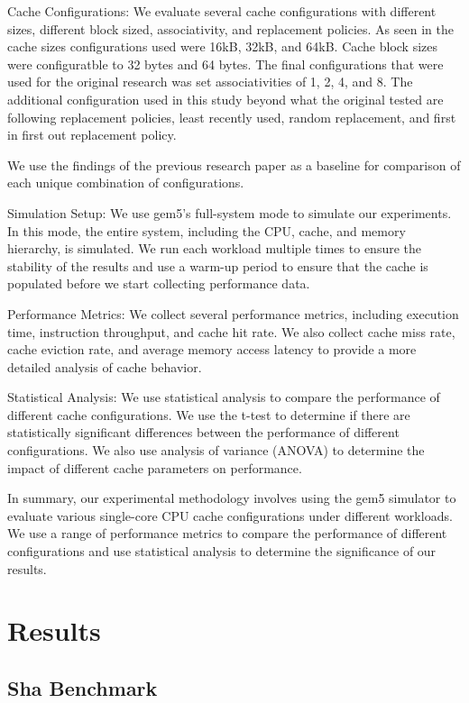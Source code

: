 \documentclass[conference]{IEEEtran}
\begin{document}
Cache Configurations:
We evaluate several cache configurations with different sizes, different block sized, associativity, and replacement policies. As seen in the cache sizes configurations used were 16kB, 32kB, and 64kB. Cache block sizes were configuratble to 32 bytes and 64 bytes. The final configurations that were used for the original research was set associativities of 1, 2, 4, and 8. The additional configuration used in this study beyond what the original tested are following replacement policies, least recently used, random replacement, and first in first out replacement policy.

We use the findings of the previous research paper as a baseline for comparison of each unique combination of configurations.

Simulation Setup:
We use gem5's full-system mode to simulate our experiments. In this mode, the entire system, including the CPU, cache, and memory hierarchy, is simulated. We run each workload multiple times to ensure the stability of the results and use a warm-up period to ensure that the cache is populated before we start collecting performance data.

Performance Metrics:
We collect several performance metrics, including execution time, instruction throughput, and cache hit rate. We also collect cache miss rate, cache eviction rate, and average memory access latency to provide a more detailed analysis of cache behavior.

Statistical Analysis:
We use statistical analysis to compare the performance of different cache configurations. We use the t-test to determine if there are statistically significant differences between the performance of different configurations. We also use analysis of variance (ANOVA) to determine the impact of different cache parameters on performance.

In summary, our experimental methodology involves using the gem5 simulator to evaluate various single-core CPU cache configurations under different workloads. We use a range of performance metrics to compare the performance of different configurations and use statistical analysis to determine the significance of our results.

\section{Results}


\subsection{Sha Benchmark}
\end{document}
